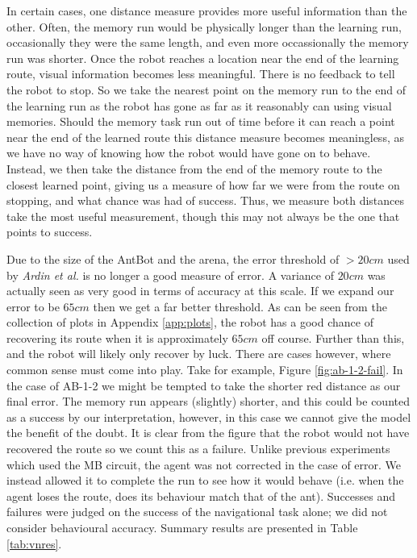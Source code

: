 \documentclass[a4paper,11pt,twoside,openright]{article}
\begin{document}
In certain cases, one distance measure provides more useful information
than the other. Often, the memory run would be physically longer than the learning run, occasionally they were the same length, and even more occassionally
the memory run was shorter. Once the robot reaches a location near the end of the learning route, visual information becomes less meaningful. There
is no feedback to tell the robot to stop. So we take the nearest point on the memory run to the end of the learning run as the robot has gone as
far as it reasonably can using visual memories. Should the memory task run out of time before it can reach a point near the end of the learned route this
distance measure becomes meaningless, as we have no way of knowing how the robot would have gone on to behave. Instead, we then take the distance
from the end of the memory route to the closest learned point, giving us a measure of how far we were from the route on stopping, and what chance
was had of success. Thus, we measure both distances take the most useful measurement, though this may not always be the one that points to success.
\newline

Due to the size of the AntBot and the arena, the error threshold of $>20cm$ used by \textit{Ardin et al.} is no longer a good
measure of error. A variance of $20cm$ was actually seen as very good in terms of accuracy at this scale. If we expand our error
to be $65cm$ then we get a far better threshold. As can be seen from the collection of plots in Appendix \ref{app:plots},
the robot has a good chance of recovering its route when it is approximately $65cm$ off course. Further than this, and the robot will
likely only recover by luck. There are cases however, where common sense must come into play. Take for example, Figure \ref{fig:ab-1-2-fail}.
In the case of AB-1-2 we might be tempted to take the shorter red distance as our final error. The memory run appears (slightly) shorter, and
this could be counted as a success by our interpretation, however, in this case we cannot give the model the benefit of the doubt.
It is clear from the figure that the robot would not have recovered the route so we count this as a failure. Unlike previous experiments
which used the MB circuit,
the agent was not corrected in the case of error. We instead allowed it to complete the run to see how it would behave (i.e. when the
agent loses the route, does its behaviour match that of the ant). Successes and failures were judged on the success of the
navigational task alone; we did not consider behavioural accuracy. Summary results are presented in Table \ref{tab:vnres}.
\newline
\end{document}
